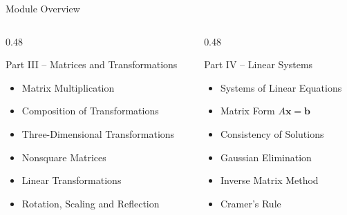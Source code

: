 \documentclass[aspectratio=169,12pt]{beamer}
\begin{document}

\begin{frame}{Module Overview}

\begin{columns}[T,totalwidth=\textwidth]

\begin{column}{0.48\textwidth}

\begin{block}{Part III -- Matrices and Transformations}

\begin{itemize}
    \item Matrix Multiplication
    \item Composition of Transformations
    \item Three-Dimensional Transformations
    \item Nonsquare Matrices
    \item Linear Transformations
    \item Rotation, Scaling and Reflection
\end{itemize}

\end{block}

\end{column}

\begin{column}{0.48\textwidth}

\begin{block}{Part IV -- Linear Systems}

\begin{itemize}
    \item Systems of Linear Equations
    \item Matrix Form \(A\mathbf{x}=\mathbf{b}\)
    \item Consistency of Solutions
    \item Gaussian Elimination
    \item Inverse Matrix Method
    \item Cramer's Rule
\end{itemize}

\end{block}

\end{column}

\end{columns}

\end{frame}
\end{document}
